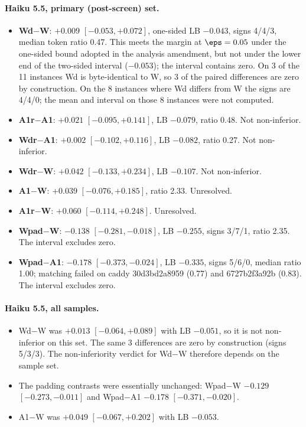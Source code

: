 \paragraph{Haiku 5.5, primary (post-screen) set.}
\begin{itemize}
\item \textbf{Wd$-$W}: $+0.009$ $[-0.053, +0.072]$, one-sided LB $-0.043$, signs 4/4/3, median token ratio 0.47. This meets the margin at $\eps = 0.05$ under the one-sided bound adopted in the analysis amendment, but not under the lower end of the two-sided interval ($-0.053$); the interval contains zero. On 3 of the 11 instances Wd is byte-identical to W, so 3 of the paired differences are zero by construction. On the 8 instances where Wd differs from W the signs are 4/4/0; the mean and interval on those 8 instances were not computed.
\item \textbf{A1r$-$A1}: $+0.021$ $[-0.095, +0.141]$, LB $-0.079$, ratio 0.48. Not non-inferior.
\item \textbf{Wdr$-$A1}: $+0.002$ $[-0.102, +0.116]$, LB $-0.082$, ratio 0.27. Not non-inferior.
\item \textbf{Wdr$-$W}: $+0.042$ $[-0.133, +0.234]$, LB $-0.107$. Not non-inferior.
\item \textbf{A1$-$W}: $+0.039$ $[-0.076, +0.185]$, ratio 2.33. Unresolved.
\item \textbf{A1r$-$W}: $+0.060$ $[-0.114, +0.248]$. Unresolved.
\item \textbf{Wpad$-$W}: $-0.138$ $[-0.281, -0.018]$, LB $-0.255$, signs 3/7/1, ratio 2.35. The interval excludes zero.
\item \textbf{Wpad$-$A1}: $-0.178$ $[-0.373, -0.024]$, LB $-0.335$, signs 5/6/0, median ratio 1.00; matching failed on caddy 30d3bd2a8959 (0.77) and 6727b2f3a92b (0.83). The interval excludes zero.
\end{itemize}

\paragraph{Haiku 5.5, all samples.}
\begin{itemize}
\item Wd$-$W was $+0.013$ $[-0.064, +0.089]$ with LB $-0.051$, so it is not non-inferior on this set. The same 3 differences are zero by construction (signs 5/3/3). The non-inferiority verdict for Wd$-$W therefore depends on the sample set.
\item The padding contrasts were essentially unchanged: Wpad$-$W $-0.129$ $[-0.273, -0.011]$ and Wpad$-$A1 $-0.178$ $[-0.371, -0.020]$.
\item A1$-$W was $+0.049$ $[-0.067, +0.202]$ with LB $-0.053$.
\end{itemize}

